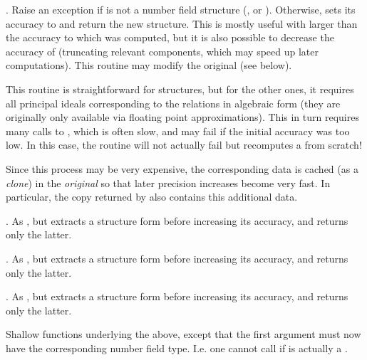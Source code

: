 
. Raise an exception if 
is not a number field structure (,  or ).
Otherwise, sets its accuracy to  and return the new structure.
This is mostly useful with  larger than the accuracy to
which  was computed, but it is also possible to decrease the accuracy
of  (truncating relevant components, which may speed up later
computations). This routine may modify the original  (see below).

This routine is straightforward for  structures, but for the
other ones, it requires all principal ideals corresponding to the 
relations in algebraic form (they are originally only available via floating
point approximations). This in turn requires many calls to
, which is often slow, and may fail if the initial
accuracy was too low. In this case, the routine will not actually fail but
recomputes a  from scratch!

Since this process may be very expensive, the corresponding data is cached
(as a \emph{clone}) in the \emph{original}  so that later precision
increases become very fast. In particular, the copy returned by
 also contains this additional data.

. As , but extracts
a  structure form  before increasing its accuracy, and
returns only the latter.

. As , but extracts a
 structure form  before increasing its accuracy, and
returns only the latter.

. As , but extracts a
 structure form  before increasing its accuracy, and
returns only the latter.




 Shallow functions
underlying the above, except that the first argument must now have the
corresponding number field type. I.e. one cannot call
 if  is actually a .

